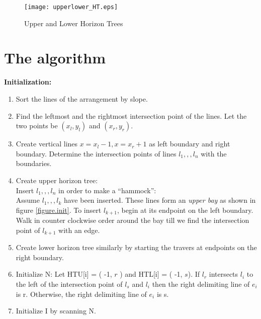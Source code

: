 \documentclass[12pt]{article}
\begin{document}
\begin{figure}
\center
\texttt{[image: upperlower\_HT.eps]}
\caption{Upper and Lower Horizon Trees}
\label{figure.upperlower}
\end{figure}



\section{The algorithm}
{\bf Initialization:}

\begin{enumerate}
\item  Sort the lines of the arrangement by slope.
\item  Find the leftmost and the rightmost intersection point of the
       lines.
       Let the two points be $(x_{l},y_{l})$ and $(x_{r},y_{r})$.
\item Create vertical lines $x = x_{l} - 1 , x = x_{r} + 1 $ as left
      boundary and right boundary.
      Determine the intersection points of  lines $l_{1}, , , l_{n}$
      with the boundaries.
\item Create upper horizon tree:\\
      Insert $l_{1}, , , l_{n}$ in order to make a ``hammock'': \\
      Assume $l_{1}, , , l_{k}$ have been inserted. These lines form
      an {\em upper bay} as shown in figure \ref{figure.init}. To insert
      $l_{k+1}$, begin at its endpoint on the left boundary. Walk in
      counter clockwise order around the bay till we find the
      intersection point of $l_{k+1}$ with an edge.
\item Create lower horizon tree similarly by starting the travers at
      endpoints on the right boundary.
\item Initialize N:
      Let HTU[i] = ( -1, $r$ ) and HTL[i] = ( -1, $s$).  If $l_{r}$
      intersects $l_{i}$ to the left of the intersection point of
      $l_{s}$ and $l_{i}$ then the right delimiting line of $e_{i}$
      is r. Otherwise, the right delimiting line of $e_{i}$ is s.
\item Initialize I by scanning N.
\end{enumerate}
\end{document}
